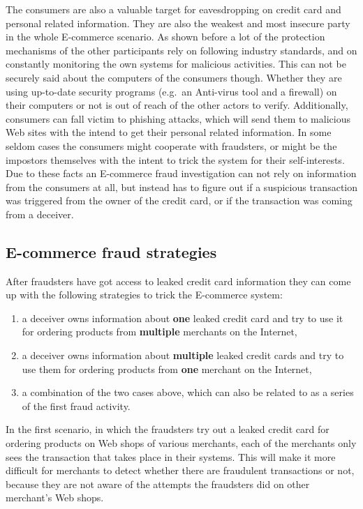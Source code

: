 The consumers are also a valuable target for eavesdropping on credit card and personal related information. They are also the weakest and most insecure party in the whole \gls{E-commerce} scenario. As shown before a lot of the protection mechanisms of the other participants rely on following industry standards, and on constantly monitoring the own systems for malicious activities. This can not be securely said about the computers of the consumers though. Whether they are using up-to-date security programs (e.g.\ an Anti-virus tool and a firewall) on their computers or not is out of reach of the other actors to verify. Additionally, consumers can fall victim to phishing attacks, which will send them to malicious Web sites with the intend to get their personal related information. In some seldom cases the consumers might cooperate with fraudsters, or might be the impostors themselves with the intent to trick the system for their self-interests. Due to these facts an \gls{E-commerce} fraud investigation can not rely on information from the consumers at all, but instead has to figure out if a suspicious transaction was triggered from the owner of the credit card, or if the transaction was coming from a deceiver.


\subsection{\Gls{E-commerce} fraud strategies}
\label{subsec:strategies_fraudster}

After fraudsters have got access to leaked credit card information they can come up with the following strategies to trick the \gls{E-commerce} system:\@

\begin{enumerate}
  \item a deceiver owns information about \textbf{one} leaked credit card and try to use it for ordering products from \textbf{multiple} merchants on the Internet,
  \item a deceiver owns information about \textbf{multiple} leaked credit cards and try to use them for ordering products from \textbf{one} merchant on the Internet,
  \item a combination of the two cases above, which can also be related to as a series of the first fraud activity.
\end{enumerate}

In the first scenario, in which the fraudsters try out a leaked credit card for ordering products on Web shops of various merchants, each of the merchants only sees the transaction that takes place in their systems. This will make it more difficult for merchants to detect whether there are fraudulent transactions or not, because they are not aware of the attempts the fraudsters did on other merchant's Web shops. \\

